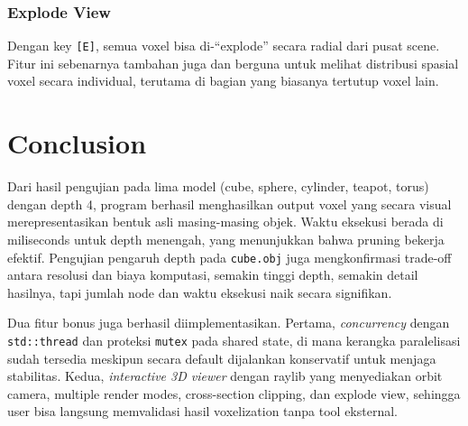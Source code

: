 \documentclass[11pt,a4paper]{article}
\begin{document}
\subsubsection*{Explode View}

Dengan key \texttt{[E]}, semua voxel bisa di-``explode'' secara radial dari pusat
scene. Fitur ini sebenarnya tambahan juga dan berguna untuk melihat distribusi spasial
voxel secara individual, terutama di bagian yang biasanya tertutup voxel lain.


\section{Conclusion}\label{sec:kesimpulan}

Dari hasil pengujian pada lima model (cube, sphere, cylinder, teapot, torus) dengan
depth 4, program berhasil menghasilkan output voxel yang secara visual merepresentasikan
bentuk asli masing-masing objek. Waktu eksekusi berada di miliseconds untuk depth
menengah, yang menunjukkan bahwa pruning bekerja efektif. Pengujian pengaruh depth
pada \texttt{cube.obj} juga mengkonfirmasi trade-off antara resolusi dan biaya komputasi,
semakin tinggi depth, semakin detail hasilnya, tapi jumlah node dan waktu eksekusi
naik secara signifikan.

Dua fitur bonus juga berhasil diimplementasikan. Pertama, \textit{concurrency}
dengan \texttt{std::thread} dan proteksi \texttt{mutex} pada shared state, di mana
kerangka paralelisasi sudah tersedia meskipun secara default dijalankan konservatif
untuk menjaga stabilitas. Kedua, \textit{interactive 3D viewer} dengan raylib yang
menyediakan orbit camera, multiple render modes, cross-section clipping, dan explode
view, sehingga user bisa langsung memvalidasi hasil voxelization tanpa tool eksternal.
\end{document}
